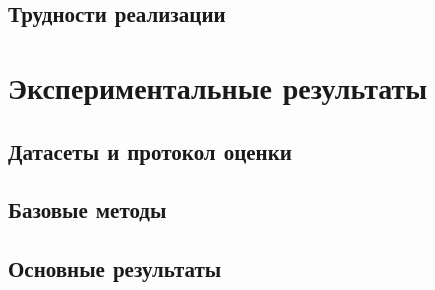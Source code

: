 \documentclass[14pt, a4paper, oneside]{extreport}
\theoremstyle{plain}
\theoremstyle{definition}
\begin{document}
\section{Трудности реализации}



\chapter{Экспериментальные результаты}
\label{ch:experiments}

\section{Датасеты и протокол оценки}


\section{Базовые методы}


\section{Основные результаты}

\end{document}
